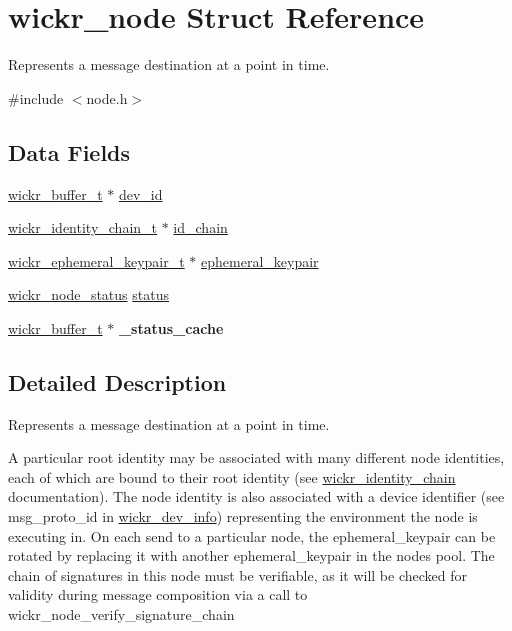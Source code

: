 \hypertarget{structwickr__node}{}\section{wickr\+\_\+node Struct Reference}
\label{structwickr__node}


Represents a message destination at a point in time.  




{\ttfamily \#include $<$node.\+h$>$}

\subsection*{Data Fields}
\begin{DoxyCompactItemize}
\item 
\mbox{\hyperlink{structwickr__buffer}{wickr\+\_\+buffer\+\_\+t}} $\ast$ \mbox{\hyperlink{structwickr__node_a564e42fc1d4b63353d74e5fbf0bead82}{dev\+\_\+id}}
\item 
\mbox{\hyperlink{structwickr__identity__chain}{wickr\+\_\+identity\+\_\+chain\+\_\+t}} $\ast$ \mbox{\hyperlink{structwickr__node_a3a5100ed26ae534e2070623713aacfde}{id\+\_\+chain}}
\item 
\mbox{\hyperlink{structwickr__ephemeral__keypair}{wickr\+\_\+ephemeral\+\_\+keypair\+\_\+t}} $\ast$ \mbox{\hyperlink{structwickr__node_a628b61eed5cb17b831ff687143393b93}{ephemeral\+\_\+keypair}}
\item 
\mbox{\hyperlink{group__wickr__node_gafa0bd3307613292fcd88e38443345e8f}{wickr\+\_\+node\+\_\+status}} \mbox{\hyperlink{structwickr__node_a659b113832d19162c4d5722777d03c94}{status}}
\item 
\mbox{\label{structwickr__node_a67160712c8b027d6ab67401c42bbd8cb}} 
\mbox{\hyperlink{structwickr__buffer}{wickr\+\_\+buffer\+\_\+t}} $\ast$ {\bfseries \+\_\+status\+\_\+cache}
\end{DoxyCompactItemize}


\subsection{Detailed Description}
Represents a message destination at a point in time. 

A particular root identity may be associated with many different node identities, each of which are bound to their root identity (see \textquotesingle{}\mbox{\hyperlink{structwickr__identity__chain}{wickr\+\_\+identity\+\_\+chain}}\textquotesingle{} documentation). The node identity is also associated with a device identifier (see \textquotesingle{}msg\+\_\+proto\+\_\+id\textquotesingle{} in \textquotesingle{}\mbox{\hyperlink{structwickr__dev__info}{wickr\+\_\+dev\+\_\+info}}\textquotesingle{}) representing the environment the node is executing in. On each send to a particular node, the ephemeral\+\_\+keypair can be rotated by replacing it with another ephemeral\+\_\+keypair in the node\textquotesingle{}s pool. The chain of signatures in this node must be verifiable, as it will be checked for validity during message composition via a call to \textquotesingle{}wickr\+\_\+node\+\_\+verify\+\_\+signature\+\_\+chain\textquotesingle{} 

